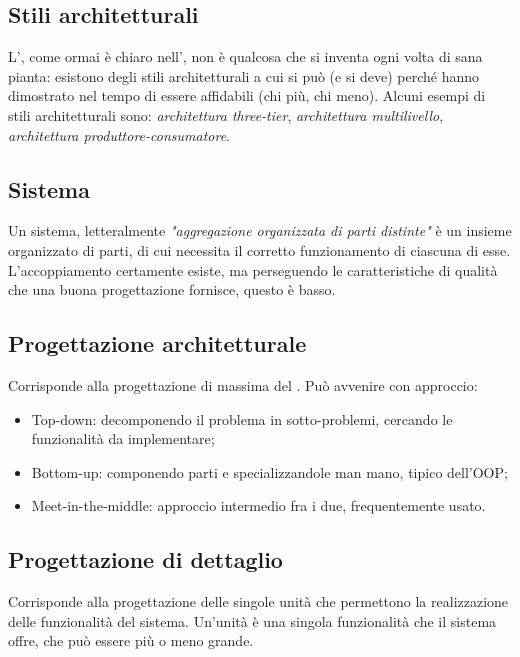 \documentclass[../main]{subfiles}
\begin{document}
\subsection{Stili architetturali}
L', come ormai è chiaro nell', non è qualcosa che si inventa ogni volta di sana pianta: esistono degli stili architetturali a cui si può (e si deve) perché hanno dimostrato nel tempo di essere affidabili (chi più, chi meno).
Alcuni esempi di stili architetturali sono: \textit{architettura three-tier}, \textit{architettura multilivello}, \textit{architettura produttore-consumatore}.
\subsection{Sistema}
Un sistema, letteralmente \textit{"aggregazione organizzata di parti distinte"} è un insieme organizzato di parti, di cui necessita il corretto funzionamento di ciascuna di esse. L'accoppiamento certamente esiste, ma perseguendo le caratteristiche di qualità che una buona progettazione fornisce, questo è basso.
\subsection{Progettazione architetturale}
Corrisponde alla progettazione di massima del . Può avvenire con approccio:
\begin{itemize}
    \item Top-down: decomponendo il problema in sotto-problemi, cercando le funzionalità da implementare;
    \item Bottom-up: componendo parti e specializzandole man mano, tipico dell'OOP;
    \item Meet-in-the-middle: approccio intermedio fra i due, frequentemente usato.
\end{itemize}
\subsection{Progettazione di dettaglio}
Corrisponde alla progettazione delle singole unità che permettono la realizzazione delle funzionalità del sistema. Un'unità è una singola funzionalità che il sistema offre, che può essere più o meno grande.
\end{document}
